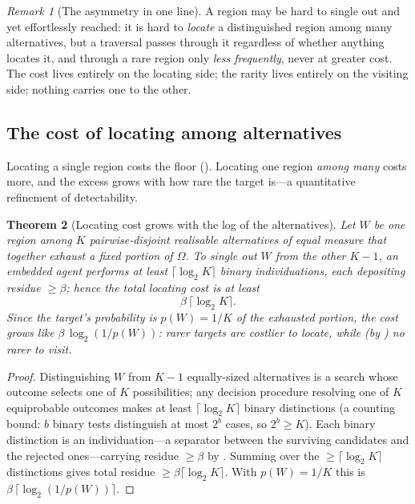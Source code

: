 \documentclass[11pt,twocolumn,a4paper]{article}
\theoremstyle{thmstyle}
\newtheorem{theorem}{Theorem}[section]
\theoremstyle{definition}
\theoremstyle{remark}
\newtheorem{remark}[theorem]{Remark}
\newcommand{\Space}{\Omega}
\newcommand{\thick}{\beta}
\begin{document}
\begin{remark}[The asymmetry in one line]
\label{rem:needle}
A region may be hard to single out and yet effortlessly reached: it is hard to
\emph{locate} a distinguished region among many alternatives, but a traversal
passes through it regardless of whether anything locates it, and through a rare
region only \emph{less frequently}, never at greater cost. The cost lives entirely
on the locating side; the rarity lives entirely on the visiting side; nothing
carries one to the other.
\end{remark}

\subsection{The cost of locating among alternatives}

Locating a single region costs the floor (). Locating one
region \emph{among many} costs more, and the excess grows with how rare the target
is---a quantitative refinement of detectability.

\begin{theorem}[Locating cost grows with the log of the alternatives]
\label{thm:locating-cost}
Let $W$ be one region among $K$ pairwise-disjoint realisable alternatives of equal
measure that together exhaust a fixed portion of $\Space$. To single out $W$ from
the other $K-1$, an embedded agent performs at least $\lceil\log_2 K\rceil$ binary
individuations, each depositing residue $\ge\thick$; hence the total locating cost
is at least
\[
\thick\,\lceil\log_2 K\rceil .
\]
Since the target's probability is $p(W)=1/K$ of the exhausted portion, the cost
grows like $\thick\,\log_2(1/p(W))$: rarer targets are costlier to locate, while
\textup{(}by \textup{)} no rarer to visit.
\end{theorem}

\begin{proof}
Distinguishing $W$ from $K-1$ equally-sized alternatives is a search whose outcome
selects one of $K$ possibilities; any decision procedure resolving one of $K$
equiprobable outcomes makes at least $\lceil\log_2 K\rceil$ binary distinctions
(a counting bound: $b$ binary tests distinguish at most $2^{b}$ cases, so
$2^{b}\ge K$). Each binary distinction is an individuation---a separator between
the surviving candidates and the rejected ones---carrying residue $\ge\thick$ by
. Summing over the $\ge\lceil\log_2 K\rceil$ distinctions
gives total residue $\ge\thick\lceil\log_2 K\rceil$. With $p(W)=1/K$ this is
$\thick\,\lceil\log_2(1/p(W))\rceil$.
\end{proof}
\end{document}
